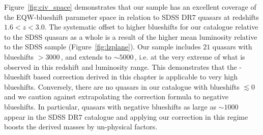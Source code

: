 Figure~\ref{fig:civ_space} demonstrates that our sample has an excellent coverage of the  EQW-blueshift parameter space in relation to SDSS DR$7$ quasars at redshifts $1.6 < z < 3.0$.
The systematic offset to higher  blueshifts for our catalogue relative to the SDSS quasars as a whole is a result of the higher mean luminosity relative to the SDSS sample (Figure~\ref{fig:lzplane}).
Our sample includes $21$ quasars with  blueshifts $>3000$\,\kms, and extends to $\sim5000$\,\kms, i.e. at the very extreme of what is observed in this redshift and luminosity range.
This demonstrates that the -blueshift based correction derived in this chapter is applicable to very high blueshifts.
Conversely, there are no quasars in our catalogue with  blueshifts $\lesssim0$\,\kms\, and we caution against extrapolating the correction formula to negative blueshifts.
In particular, quasars with negative blueshifts as large as $\sim1000$\,\kms\, appear in the SDSS DR$7$ catalogue and applying our correction in this regime boosts the derived masses by un-physical factors.

